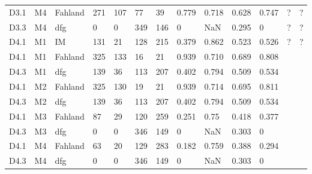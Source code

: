 \begin{table}[h]
{\begin{tabular}{lll|llllllll|ll}
			D3.1      & M4              & Fahland   &  271   & 107   &  77   &  39   & 0.779       &   0.718        &   0.628       &  0.747    &      ?             &          ?           \\
			
			D3.3      & M4              & dfg       &  0   &  0  &   349  &  146   &   0     &      NaN     & 0.295         &    0  &           ?        &    ?                 \\
		\hline
			D4.1      & M1              & IM &  131   &  21  & 128    &  215   &    0.379    & 0.862           &   0.523       &    0.526  &           ?        &      ?               \\
			D4.1      & M1              & Fahland   &  325   &  133  &  16   & 21    &   0.939     &  0.710         &  0.689       & 0.808     &                   &                     \\
			
			D4.3      & M1              & dfg       &  139   & 36   & 113    &   207  &   0.402     &   0.794        &   0.509       &   0.534   &                   &                     \\
			\hline
			D4.1      & M2              & Fahland   & 325    &  130  & 19    &  21   & 0.939       &    0.714       &  0.695        &  0.811    &                   &                     \\
		
			D4.3      & M2              & dfg     &  139   & 36   & 113    &   207  &   0.402     &   0.794        &   0.509       &   0.534   &                   &                     \\
			\hline
			D4.1      & M3              & Fahland   & 87    &  29  & 120    &  259   & 0.251       &    0.75       &  0.418        &  0.377    &                   &                     \\
		
			D4.3      & M3              & dfg       &  0   &  0  & 346    &  149   &  0      &   NaN        &   0.303       &  0    &                   &   \\ 
			\hline
			D4.1      & M4              & Fahland   & 63    &  20  & 129    &  283   & 0.182       &    0.759       &  0.388        &  0.294    &                   &                     \\
		
			D4.3      & M4              & dfg       &   0  & 0   &  346   & 149    &   0     &    NaN       &     0.303     &  0    &                   &   \\    
			 \hline              
		\end{tabular}}
	\end{table}

